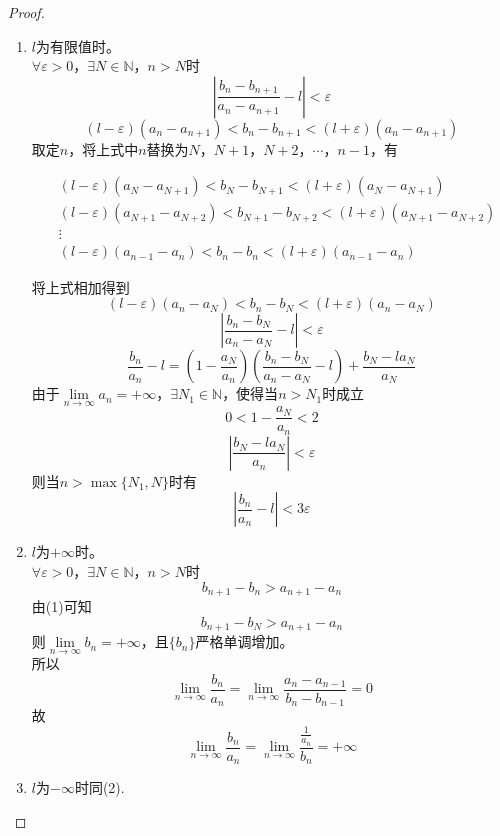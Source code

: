 \begin{proof}

    \begin{enumerate}

        \item
            $l$为有限值时。\\
            $\forall \varepsilon > 0$，$\exists N \in \mathbb{N}$，$n > N$时
            $$\left| \dfrac{b_n - b_{n + 1}}{a_n - a_{n + 1}} - l \right| < \varepsilon$$
            $$(l - \varepsilon)(a_n - a_{n + 1}) < b_n - b_{n + 1} < (l + \varepsilon)(a_n - a_{n + 1})$$
            取定$n$，将上式中$n$替换为$N$，$N + 1$，$N + 2$，$\cdots$，$n - 1$，有

            \begin{align*}
                & (l - \varepsilon)(a_{N} - a_{N + 1}) < b_{N} - b_{N + 1} < (l + \varepsilon)(a_{N} - a_{N + 1}) \\
                & (l - \varepsilon)(a_{N + 1} - a_{N + 2}) < b_{N + 1} - b_{N + 2} < (l + \varepsilon)(a_{N + 1} - a_{N + 2}) \\
                & \vdots \\
                & (l - \varepsilon)(a_{n - 1} - a_{n}) < b_{n} - b_{n} < (l + \varepsilon)(a_{n - 1} - a_{n})
            \end{align*}

            将上式相加得到
            $$(l - \varepsilon)(a_{n} - a_{N}) < b_{n} - b_{N} < (l + \varepsilon)(a_{n} - a_{N})$$
            $$\left| \dfrac{b_n - b_{N}}{a_n - a_{N}} - l \right| < \varepsilon$$
            $$\dfrac{b_n}{a_n} - l = \left( 1 - \dfrac{a_N}{a_n} \right)\left( \dfrac{b_n - b_N}{a_n - a_N} - l \right) + \dfrac{b_N - la_N}{a_N}$$
            由于$\lim\limits_{n \to \infty}{a_n} = +\infty$，$\exists N_1 \in \mathbb{N}$，使得当$n > N_1$时成立
            $$0 < 1 - \dfrac{a_N}{a_n} < 2$$
            $$\left| \dfrac{b_N - la_N}{a_n} \right| < \varepsilon$$
            则当$n > \max\{N_1, N\}$时有
            $$\left| \dfrac{b_n}{a_n} - l \right| < 3\varepsilon$$

        \item
            $l$为$+\infty$时。\\
            $\forall \varepsilon > 0$，$\exists N \in \mathbb{N}$，$n > N$时
            $$b_{n + 1} - b_n > a_{n + 1} - a_n$$
            由\textup{(1)}可知
            $$b_{n + 1} - b_N > a_{n + 1} - a_n$$
            则$\lim\limits_{n \to \infty}{b_n} = +\infty$，且$\{b_n\}$严格单调增加。\\
            所以
            $$\lim\limits_{n \to \infty}{\dfrac{b_n}{a_n}} = \lim\limits_{n \to \infty}{\dfrac{a_n - a_{n - 1}}{b_n - b_{n - 1}}} = 0$$
            故
            $$\lim\limits_{n \to \infty}{\dfrac{b_n}{a_n}} = \lim\limits_{n \to \infty}{\dfrac{\frac{1}{a_n}}{b_n}} = +\infty$$

        \item $l$为$-\infty$时同\textup{(2)}.

    \end{enumerate}

\end{proof}

